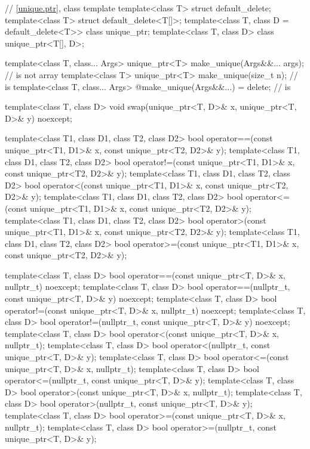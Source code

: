 \begin{codeblock}
{  // \ref{unique.ptr}, class template 
  template<class T> struct default_delete;
  template<class T> struct default_delete<T[]>;
  template<class T, class D = default_delete<T>> class unique_ptr;
  template<class T, class D> class unique_ptr<T[], D>;

  template<class T, class... Args> unique_ptr<T>
    make_unique(Args&&... args);                                                //  is not array
  template<class T> unique_ptr<T>
    make_unique(size_t n);                                                      //  is 
  template<class T, class... Args>
    @\unspecnc@ make_unique(Args&&...) = delete;                                //  is 

  template<class T, class D>
    void swap(unique_ptr<T, D>& x, unique_ptr<T, D>& y) noexcept;

  template<class T1, class D1, class T2, class D2>
    bool operator==(const unique_ptr<T1, D1>& x, const unique_ptr<T2, D2>& y);
  template<class T1, class D1, class T2, class D2>
    bool operator!=(const unique_ptr<T1, D1>& x, const unique_ptr<T2, D2>& y);
  template<class T1, class D1, class T2, class D2>
    bool operator<(const unique_ptr<T1, D1>& x, const unique_ptr<T2, D2>& y);
  template<class T1, class D1, class T2, class D2>
    bool operator<=(const unique_ptr<T1, D1>& x, const unique_ptr<T2, D2>& y);
  template<class T1, class D1, class T2, class D2>
    bool operator>(const unique_ptr<T1, D1>& x, const unique_ptr<T2, D2>& y);
  template<class T1, class D1, class T2, class D2>
    bool operator>=(const unique_ptr<T1, D1>& x, const unique_ptr<T2, D2>& y);

  template<class T, class D>
    bool operator==(const unique_ptr<T, D>& x, nullptr_t) noexcept;
  template<class T, class D>
    bool operator==(nullptr_t, const unique_ptr<T, D>& y) noexcept;
  template<class T, class D>
    bool operator!=(const unique_ptr<T, D>& x, nullptr_t) noexcept;
  template<class T, class D>
    bool operator!=(nullptr_t, const unique_ptr<T, D>& y) noexcept;
  template<class T, class D>
    bool operator<(const unique_ptr<T, D>& x, nullptr_t);
  template<class T, class D>
    bool operator<(nullptr_t, const unique_ptr<T, D>& y);
  template<class T, class D>
    bool operator<=(const unique_ptr<T, D>& x, nullptr_t);
  template<class T, class D>
    bool operator<=(nullptr_t, const unique_ptr<T, D>& y);
  template<class T, class D>
    bool operator>(const unique_ptr<T, D>& x, nullptr_t);
  template<class T, class D>
    bool operator>(nullptr_t, const unique_ptr<T, D>& y);
  template<class T, class D>
    bool operator>=(const unique_ptr<T, D>& x, nullptr_t);
  template<class T, class D>
    bool operator>=(nullptr_t, const unique_ptr<T, D>& y);

}
\end{codeblock}

